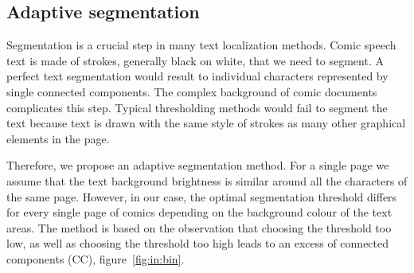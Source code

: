 

\subsection{Adaptive segmentation}
\label{sec:te:segmentation}
Segmentation is a crucial step in many text localization methods. Comic speech text is made of strokes, generally black on white, that we need to segment. A perfect text segmentation would result to individual characters represented by single connected components. The complex background of comic documents complicates this step. Typical thresholding methods would fail to segment the text because text is drawn with the same style of strokes as many other graphical elements in the page.

Therefore, we propose an adaptive segmentation method. For a single page we assume that the text background brightness is similar around all the characters of the same page. However, in our case, the optimal segmentation threshold differs for every single page of comics depending on the background colour of the text areas. The method is based on the observation that choosing the threshold too low, as well as choosing the threshold too high leads to an excess of connected components (CC), figure~\ref{fig:in:bin}.


